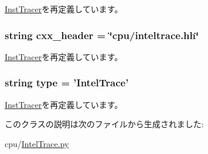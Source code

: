 \hyperlink{classInstTracer_1_1InstTracer_a58cd55cd4023648e138237cfc0822ae3}{InstTracer}を再定義しています。\hypertarget{classIntelTrace_1_1IntelTrace_a17da7064bc5c518791f0c891eff05fda}{
\subsubsection[{cxx\_\-header}]{\setlength{\rightskip}{0pt plus 5cm}string {\bf cxx\_\-header} = \char`\"{}cpu/inteltrace.hh\char`\"{}}}
\label{classIntelTrace_1_1IntelTrace_a17da7064bc5c518791f0c891eff05fda}


\hyperlink{classInstTracer_1_1InstTracer_a17da7064bc5c518791f0c891eff05fda}{InstTracer}を再定義しています。\hypertarget{classIntelTrace_1_1IntelTrace_acce15679d830831b0bbe8ebc2a60b2ca}{
\subsubsection[{type}]{\setlength{\rightskip}{0pt plus 5cm}string {\bf type} = '{\bf IntelTrace}'}}
\label{classIntelTrace_1_1IntelTrace_acce15679d830831b0bbe8ebc2a60b2ca}


\hyperlink{classInstTracer_1_1InstTracer_acce15679d830831b0bbe8ebc2a60b2ca}{InstTracer}を再定義しています。

このクラスの説明は次のファイルから生成されました:\begin{DoxyCompactItemize}
\item 
cpu/\hyperlink{IntelTrace_8py}{IntelTrace.py}\end{DoxyCompactItemize}
